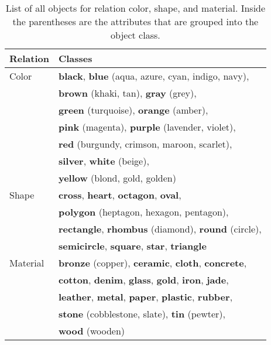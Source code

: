 \documentclass[11pt]{article}
\begin{document}
\begin{table}[ht]
\small
\centering
\begin{tabular}{ll}
\hline
\textbf{Relation} & \textbf{Classes}\\
\hline
Color & \textbf{black}, \textbf{blue} (aqua, azure, cyan, indigo, navy), \\
& \textbf{brown} (khaki, tan), \textbf{gray} (grey), \\
& \textbf{green} (turquoise), \textbf{orange} (amber), \\
& \textbf{pink} (magenta), \textbf{purple} (lavender, violet), \\
& \textbf{red} (burgundy, crimson, maroon, scarlet), \\
& \textbf{silver}, \textbf{white} (beige), \\
& \textbf{yellow} (blond, gold, golden) \\
Shape & \textbf{cross}, \textbf{heart}, \textbf{octagon}, \textbf{oval}, \\
& \textbf{polygon} (heptagon, hexagon, pentagon), \\
& \textbf{rectangle}, \textbf{rhombus} (diamond), \textbf{round} (circle), \\
& \textbf{semicircle}, \textbf{square}, \textbf{star}, \textbf{triangle} \\
Material & \textbf{bronze} (copper), \textbf{ceramic}, \textbf{cloth}, \textbf{concrete}, \\
& \textbf{cotton}, \textbf{denim}, \textbf{glass}, \textbf{gold}, \textbf{iron}, \textbf{jade}, \\
& \textbf{leather}, \textbf{metal}, \textbf{paper}, \textbf{plastic}, \textbf{rubber}, \\
& \textbf{stone} (cobblestone, slate), \textbf{tin} (pewter), \\
& \textbf{wood} (wooden) \\
\hline
\end{tabular}
\caption{\label{obj-ls}
List of all objects for relation color, shape, and material. Inside the parentheses are the attributes that are grouped into the object class.}
\end{table}
\end{document}
